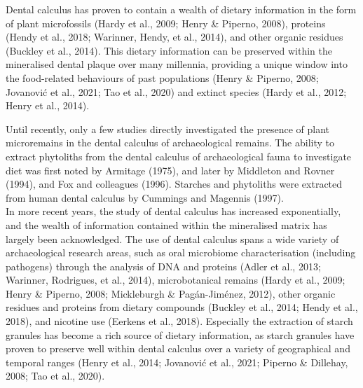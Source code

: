 \documentclass[
  letterpaper,
]{book}
\begin{document}
Dental calculus has proven to contain a wealth of dietary information in
the form of plant microfossils (Hardy et al., 2009; Henry \& Piperno,
2008), proteins (Hendy et al., 2018; Warinner, Hendy, et al., 2014), and
other organic residues (Buckley et al., 2014). This dietary information
can be preserved within the mineralised dental plaque over many
millennia, providing a unique window into the food-related behaviours of
past populations (Henry \& Piperno, 2008; Jovanović et al., 2021; Tao et
al., 2020) and extinct species (Hardy et al., 2012; Henry et al., 2014).

Until recently, only a few studies directly investigated the presence of
plant microremains in the dental calculus of archaeological remains. The
ability to extract phytoliths from the dental calculus of archaeological
fauna to investigate diet was first noted by Armitage (1975), and later
by Middleton and Rovner (1994), and Fox and colleagues (1996). Starches
and phytoliths were extracted from human dental calculus by Cummings and
Magennis (1997).\\
In more recent years, the study of dental calculus has increased
exponentially, and the wealth of information contained within the
mineralised matrix has largely been acknowledged. The use of dental
calculus spans a wide variety of archaeological research areas, such as
oral microbiome characterisation (including pathogens) through the
analysis of DNA and proteins (Adler et al., 2013; Warinner, Rodrigues,
et al., 2014), microbotanical remains (Hardy et al., 2009; Henry \&
Piperno, 2008; Mickleburgh \& Pagán-Jiménez, 2012), other organic
residues and proteins from dietary compounds (Buckley et al., 2014;
Hendy et al., 2018), and nicotine use (Eerkens et al., 2018). Especially
the extraction of starch granules has become a rich source of dietary
information, as starch granules have proven to preserve well within
dental calculus over a variety of geographical and temporal ranges
(Henry et al., 2014; Jovanović et al., 2021; Piperno \& Dillehay, 2008;
Tao et al., 2020).
\end{document}
